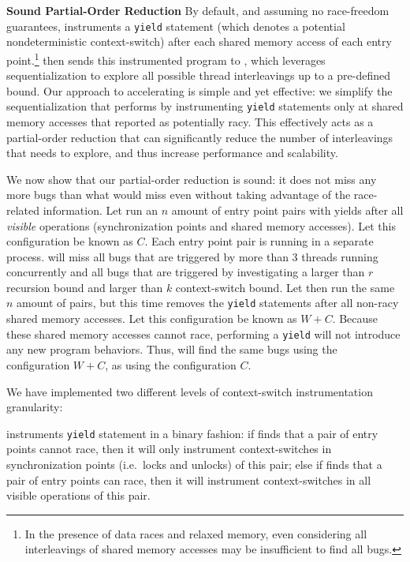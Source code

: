 \medskip\noindent\textbf{Sound Partial-Order Reduction }
%
By default, and assuming no race-freedom guarantees, \whoop instruments a \texttt{yield} statement (which denotes a potential nondeterministic context-switch) after each shared memory access of each entry point.\footnote{In the presence of data races and relaxed memory, even considering all interleavings of shared memory accesses may be insufficient to find all bugs.} \whoop then sends this instrumented program to \corral, which leverages sequentialization to explore all possible thread interleavings up to a pre-defined bound. Our approach to accelerating \corral is simple and yet effective: we simplify the sequentialization that \corral performs by instrumenting \texttt{yield} statements only at shared memory accesses that \whoop reported as potentially racy. This effectively acts as a partial-order reduction that can significantly reduce the number of interleavings that \corral needs to explore, and thus increase performance and scalability.


We now show that our partial-order reduction is sound: it does not miss any more bugs than what \corral would miss even without taking advantage of the \whoop race-related information. Let \corral run an $n$ amount of entry point pairs with yields after all \emph{visible} operations (synchronization points and shared memory accesses). Let this configuration be known as $C$. Each entry point pair is running in a separate \corral process. \corral will miss all bugs that are triggered by more than 3 threads running concurrently and all bugs that are triggered by investigating a larger than $r$ recursion bound and larger than $k$ context-switch bound. Let \corral then run the same $n$ amount of pairs, but this time \whoop removes the \texttt{yield} statements after all non-racy shared memory accesses. Let this configuration be known as $W+C$. Because these shared memory accesses cannot race, performing a \texttt{yield} will not introduce any new program behaviors. Thus, \corral will find the same bugs using the configuration $W+C$, as using the configuration $C$.

We have implemented two different levels of context-switch instrumentation granularity:

\yieldcoarse instruments \texttt{yield} statement in a binary fashion: if \whoop
finds that a pair of entry points cannot race, then it will only instrument
context-switches in synchronization points (i.e.\ locks and unlocks) of this pair; else if \whoop finds
that a pair of entry points can race, then it will instrument context-switches
in all visible operations of this pair.

